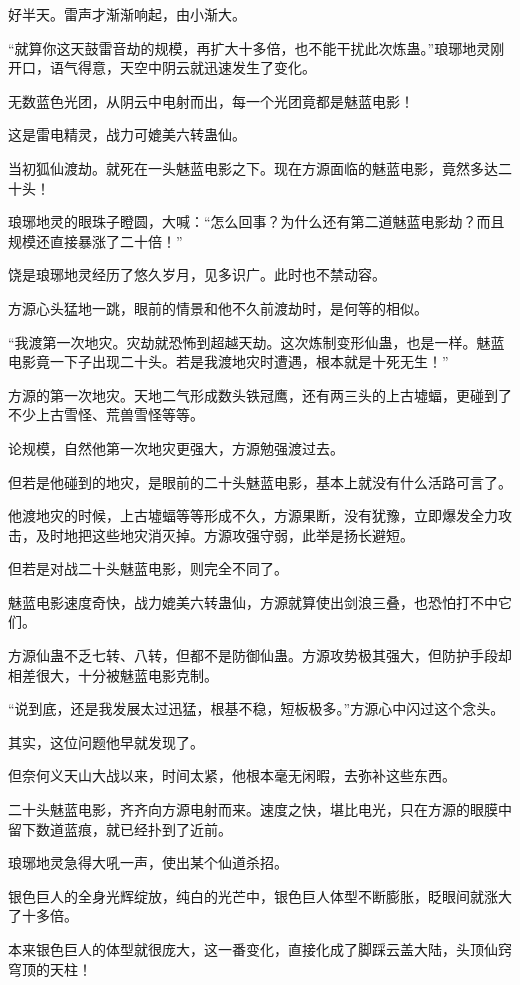 \begin{this_body}
好半天。雷声才渐渐响起，由小渐大。

“就算你这天鼓雷音劫的规模，再扩大十多倍，也不能干扰此次炼蛊。”琅琊地灵刚开口，语气得意，天空中阴云就迅速发生了变化。

无数蓝色光团，从阴云中电射而出，每一个光团竟都是魅蓝电影！

这是雷电精灵，战力可媲美六转蛊仙。

当初狐仙渡劫。就死在一头魅蓝电影之下。现在方源面临的魅蓝电影，竟然多达二十头！

琅琊地灵的眼珠子瞪圆，大喊：“怎么回事？为什么还有第二道魅蓝电影劫？而且规模还直接暴涨了二十倍！”

饶是琅琊地灵经历了悠久岁月，见多识广。此时也不禁动容。

方源心头猛地一跳，眼前的情景和他不久前渡劫时，是何等的相似。

“我渡第一次地灾。灾劫就恐怖到超越天劫。这次炼制变形仙蛊，也是一样。魅蓝电影竟一下子出现二十头。若是我渡地灾时遭遇，根本就是十死无生！”

方源的第一次地灾。天地二气形成数头铁冠鹰，还有两三头的上古墟蝠，更碰到了不少上古雪怪、荒兽雪怪等等。

论规模，自然他第一次地灾更强大，方源勉强渡过去。

但若是他碰到的地灾，是眼前的二十头魅蓝电影，基本上就没有什么活路可言了。

他渡地灾的时候，上古墟蝠等等形成不久，方源果断，没有犹豫，立即爆发全力攻击，及时地把这些地灾消灭掉。方源攻强守弱，此举是扬长避短。

但若是对战二十头魅蓝电影，则完全不同了。

魅蓝电影速度奇快，战力媲美六转蛊仙，方源就算使出剑浪三叠，也恐怕打不中它们。

方源仙蛊不乏七转、八转，但都不是防御仙蛊。方源攻势极其强大，但防护手段却相差很大，十分被魅蓝电影克制。

“说到底，还是我发展太过迅猛，根基不稳，短板极多。”方源心中闪过这个念头。

其实，这位问题他早就发现了。

但奈何义天山大战以来，时间太紧，他根本毫无闲暇，去弥补这些东西。

二十头魅蓝电影，齐齐向方源电射而来。速度之快，堪比电光，只在方源的眼膜中留下数道蓝痕，就已经扑到了近前。

琅琊地灵急得大吼一声，使出某个仙道杀招。

银色巨人的全身光辉绽放，纯白的光芒中，银色巨人体型不断膨胀，眨眼间就涨大了十多倍。

本来银色巨人的体型就很庞大，这一番变化，直接化成了脚踩云盖大陆，头顶仙窍穹顶的天柱！


\end{this_body}
